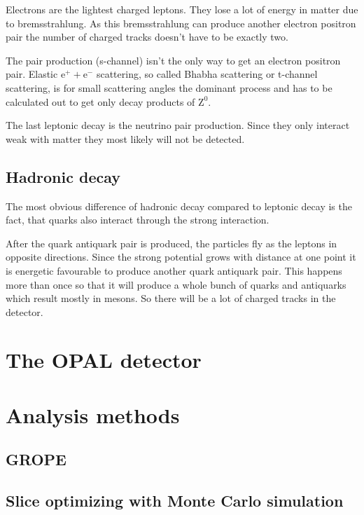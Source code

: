 \documentclass[11pt, english, fleqn, DIV=15, headinclude, BCOR=2cm]{scrreprt}
\begin{document}
Electrons are the lightest charged leptons. They lose a lot of energy in
matter due to bremsstrahlung. As this bremsstrahlung can produce another
electron positron pair the number of charged tracks doesn't have to be exactly
two.

The pair production (s-channel) isn't the only way to get an electron positron
pair. Elastic $\mathrm e^+ + \mathrm e^-$ scattering, so called Bhabha
scattering or t-channel scattering, is for small scattering angles the
dominant process and has to be calculated out to get only decay products of
$\mathrm Z^0$.

The last leptonic decay is the neutrino pair production. Since they only
interact weak with matter they most likely will not be detected.

\subsection{Hadronic decay}

The most obvious difference of hadronic decay compared to leptonic decay is
the fact, that quarks also interact through the strong interaction.

After the quark antiquark pair is produced, the particles fly as the leptons
in opposite directions. Since the strong potential grows with distance at one
point it is energetic favourable to produce another quark antiquark pair. This
happens more than once so that it will produce a whole bunch of quarks and
antiquarks which result mostly in mesons. So there will be a lot of charged
tracks in the detector.

\section{The OPAL detector}

\section{Analysis methods}

\subsection{GROPE}

\subsection{Slice optimizing with Monte Carlo simulation}
\end{document}
